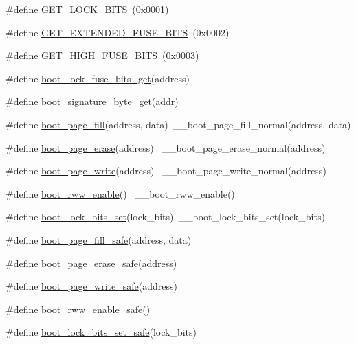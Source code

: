 \begin{DoxyCompactItemize}
\item 
\#define \hyperlink{group__avr__boot_gae12d288a22cfbfa9d0cde12b1a779bfe}{G\+E\+T\+\_\+\+L\+O\+C\+K\+\_\+\+B\+I\+TS}~(0x0001)
\item 
\#define \hyperlink{group__avr__boot_gaf08aabaebbd69da659357f402d4d28ce}{G\+E\+T\+\_\+\+E\+X\+T\+E\+N\+D\+E\+D\+\_\+\+F\+U\+S\+E\+\_\+\+B\+I\+TS}~(0x0002)
\item 
\#define \hyperlink{group__avr__boot_ga44e70c9662e7ac06484144c15bc69aea}{G\+E\+T\+\_\+\+H\+I\+G\+H\+\_\+\+F\+U\+S\+E\+\_\+\+B\+I\+TS}~(0x0003)
\item 
\#define \hyperlink{group__avr__boot_ga37ce7078335dd85f04d150a52a01d6ad}{boot\+\_\+lock\+\_\+fuse\+\_\+bits\+\_\+get}(address)                                  
\item 
\#define \hyperlink{group__avr__boot_gaf375d2543ba38dc56697b4f4bc37a717}{boot\+\_\+signature\+\_\+byte\+\_\+get}(addr)
\item 
\#define \hyperlink{group__avr__boot_ga61add108c778273ff68233d044c3acca}{boot\+\_\+page\+\_\+fill}(address,  data)~\+\_\+\+\_\+boot\+\_\+page\+\_\+fill\+\_\+normal(address, data)
\item 
\#define \hyperlink{group__avr__boot_ga8c128c031cee4e82ea4950873048db14}{boot\+\_\+page\+\_\+erase}(address)        ~\+\_\+\+\_\+boot\+\_\+page\+\_\+erase\+\_\+normal(address)
\item 
\#define \hyperlink{group__avr__boot_ga8764dc7bdbd459e5d850bafaa0a6e41a}{boot\+\_\+page\+\_\+write}(address)        ~\+\_\+\+\_\+boot\+\_\+page\+\_\+write\+\_\+normal(address)
\item 
\#define \hyperlink{group__avr__boot_ga5ce9d92fa9c0b2b79c62a09980909f1f}{boot\+\_\+rww\+\_\+enable}()                      ~\+\_\+\+\_\+boot\+\_\+rww\+\_\+enable()
\item 
\#define \hyperlink{group__avr__boot_gadaa352690ac1c82c535da9d8faf77590}{boot\+\_\+lock\+\_\+bits\+\_\+set}(lock\+\_\+bits)~\+\_\+\+\_\+boot\+\_\+lock\+\_\+bits\+\_\+set(lock\+\_\+bits)
\item 
\#define \hyperlink{group__avr__boot_ga3f549e2ef9ca0f119a7070064c4dc372}{boot\+\_\+page\+\_\+fill\+\_\+safe}(address,  data)
\item 
\#define \hyperlink{group__avr__boot_ga5c345350a2fb349619b859dcf0dc0466}{boot\+\_\+page\+\_\+erase\+\_\+safe}(address)
\item 
\#define \hyperlink{group__avr__boot_ga107ad4c789e5c498062947d394ed98d5}{boot\+\_\+page\+\_\+write\+\_\+safe}(address)
\item 
\#define \hyperlink{group__avr__boot_gaeb0dba1dd9d338516a94c0bd8a8db78a}{boot\+\_\+rww\+\_\+enable\+\_\+safe}()
\item 
\#define \hyperlink{group__avr__boot_gac80bd4f863ff7645204adb0eda3556ea}{boot\+\_\+lock\+\_\+bits\+\_\+set\+\_\+safe}(lock\+\_\+bits)
\end{DoxyCompactItemize}


